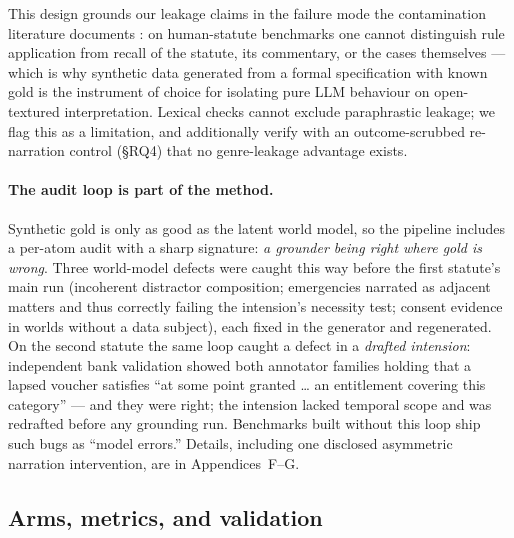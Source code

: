 This design grounds our leakage claims in the failure mode the contamination
literature documents \citep{magar2022contamination,sainz2023contamination}:
on human-statute benchmarks one cannot distinguish rule application from
recall of the statute, its commentary, or the cases themselves --- which is
why synthetic data generated from a formal specification with known gold is
the instrument of choice for isolating pure LLM behaviour on open-textured
interpretation. Lexical checks cannot exclude paraphrastic leakage; we flag
this as a limitation, and additionally verify with an outcome-scrubbed
re-narration control (\S RQ4) that no genre-leakage advantage exists.

\paragraph{The audit loop is part of the method.} Synthetic gold is only as
good as the latent world model, so the pipeline includes a per-atom audit
with a sharp signature: \emph{a grounder being right where gold is wrong}.
Three world-model defects were caught this way before the first statute's
main run (incoherent distractor composition; emergencies narrated as
adjacent matters and thus correctly failing the intension's necessity test;
consent evidence in worlds without a data subject), each fixed in the
generator and regenerated. On the second statute the same loop caught a
defect in a \emph{drafted intension}: independent bank validation showed
both annotator families holding that a lapsed voucher satisfies ``at some
point granted \dots{} an entitlement covering this category'' --- and they
were right; the intension lacked temporal scope and was redrafted before any
grounding run. Benchmarks built without this loop ship such bugs as ``model
errors.'' Details, including one disclosed asymmetric narration
intervention, are in Appendices~F--G.

\subsection{Arms, metrics, and validation}

